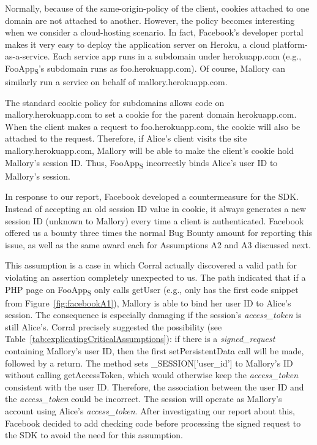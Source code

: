 Normally, because of the same-origin-policy of the client, cookies attached to one domain are not attached to another. However, the policy becomes interesting when we consider a cloud-hosting scenario.  In fact, Facebook's developer portal makes it very easy to deploy the application server on Heroku, a cloud platform-as-a-service.  Each service app runs in a subdomain under herokuapp.com (e.g., FooApp\textsubscript{S}'s subdomain runs as foo.herokuapp.com).  Of course, Mallory can similarly run a service on behalf of mallory.herokuapp.com.

The standard cookie policy for subdomains allows code on mallory.herokuapp.com to set a cookie for the parent domain herokuapp.com.  When the client makes a request to foo.herokuapp.com, the cookie will also be attached to the request. Therefore, if Alice's client visits the site mallory.herokuapp.com, Mallory will be able to make the client's cookie hold Mallory's session ID.  Thus, FooApp\textsubscript{S} incorrectly binds Alice's user ID to Mallory's session. 

In response to our report, Facebook developed a countermeasure for the SDK.  Instead of accepting an old session ID value in cookie, it always generates a new session ID (unknown to Mallory) every time a client is authenticated.  Facebook offered us a bounty three times the normal Bug Bounty amount for reporting this issue, as well as the same award each for Assumptions A2 and A3 discussed next. 

 This assumption is a case in which Corral actually discovered a valid path for violating an assertion completely unexpected to us.  The path indicated that if a PHP page on FooApp\textsubscript{S} only calls getUser (e.g., only has the first code snippet from Figure~\ref{fig:facebookA1}), Mallory is able to bind her user ID to Alice's session.  The consequence is especially damaging if the session's \emph{access\_token} is still Alice's.  Corral precisely suggested the possibility (see Table~\ref{tab:explicatingCriticalAssumptions}): if there is a \emph{signed\_request} containing Mallory's user ID, then the first setPersistentData call will be made, followed by a return.  The method sets \_SESSION['user\_id'] to Mallory's ID without calling getAccessToken, which would otherwise keep the \emph{access\_token} consistent with the user ID.  Therefore, the association between the user ID and the \emph{access\_token} could be incorrect. The session will operate as Mallory's account using Alice's \emph{access\_token}.  After investigating our report about this, Facebook decided to add checking code before processing the signed request to the SDK to avoid the need for this assumption.

